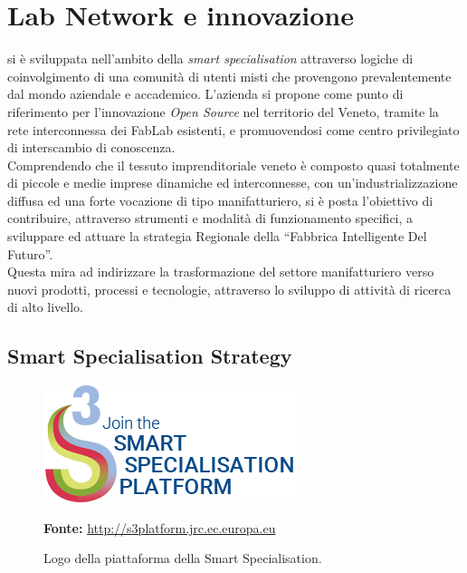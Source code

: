 \section{Lab Network e innovazione}
\lab{} si è sviluppata nell’ambito della \textit{smart specialisation} attraverso logiche di coinvolgimento di una comunità di utenti misti che provengono prevalentemente dal mondo aziendale e accademico. 
L'azienda si propone come punto di riferimento per l’innovazione \textit{Open Source} nel territorio del Veneto, tramite la rete interconnessa dei \gls{FabLab} esistenti, e promuovendosi come centro privilegiato di interscambio di conoscenza.\\
Comprendendo che il tessuto imprenditoriale veneto è composto quasi totalmente di piccole e medie imprese dinamiche ed interconnesse, con un’industrializzazione diffusa ed una forte vocazione di tipo manifatturiero, \lab{} si è posta l’obiettivo di contribuire, attraverso strumenti e modalità di funzionamento specifici, a sviluppare ed attuare la strategia Regionale della ``Fabbrica Intelligente Del Futuro''.\\
Questa mira ad indirizzare la trasformazione del settore manifatturiero verso nuovi prodotti, processi e tecnologie, attraverso lo sviluppo di attività di ricerca di alto livello.

\subsection{Smart Specialisation Strategy}
\begin{figure}[H]
	\begin{center}
	\includegraphics[scale=0.4]{immagini/join-s3p.png}
	\caption{Logo della piattaforma della Smart Specialisation.}
	\small{\textbf{Fonte:} \url{http://s3platform.jrc.ec.europa.eu}}
	\end{center}
\end{figure}

